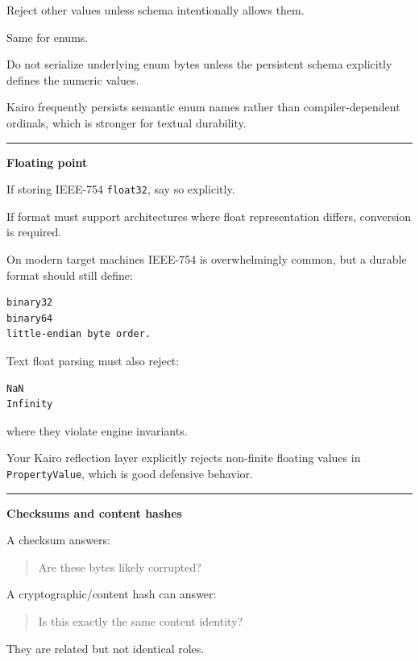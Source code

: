 Reject other values unless schema intentionally allows them.

Same for enums.

Do not serialize underlying enum bytes unless the persistent schema explicitly defines the numeric values.

Kairo frequently persists semantic enum names rather than compiler-dependent ordinals, which is stronger for textual durability.

\begin{center}\rule{0.5\linewidth}{0.5pt}\end{center}

\textbf{Floating point}

If storing IEEE-754 \texttt{float32}, say so explicitly.

If format must support architectures where float representation differs, conversion is required.

On modern target machines IEEE-754 is overwhelmingly common, but a durable format should still define:

\begin{verbatim}
binary32
binary64
little-endian byte order.
\end{verbatim}

Text float parsing must also reject:

\begin{verbatim}
NaN
Infinity
\end{verbatim}

where they violate engine invariants.

Your Kairo reflection layer explicitly rejects non-finite floating values in \texttt{PropertyValue}, which is good defensive behavior.

\begin{center}\rule{0.5\linewidth}{0.5pt}\end{center}

\textbf{Checksums and content hashes}

A checksum answers:

\begin{quote}
Are these bytes likely corrupted?
\end{quote}

A cryptographic/content hash can answer:

\begin{quote}
Is this exactly the same content identity?
\end{quote}

They are related but not identical roles.


